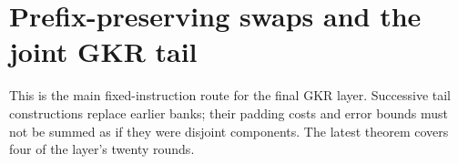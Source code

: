\section{Prefix-preserving swaps and the joint GKR tail}\label{sec:gkr-tail}

This is the main fixed-instruction route for the final GKR layer. Successive tail constructions replace earlier banks; their padding costs and error bounds must not be summed as if they were disjoint components. The latest theorem covers four of the layer's twenty rounds.







